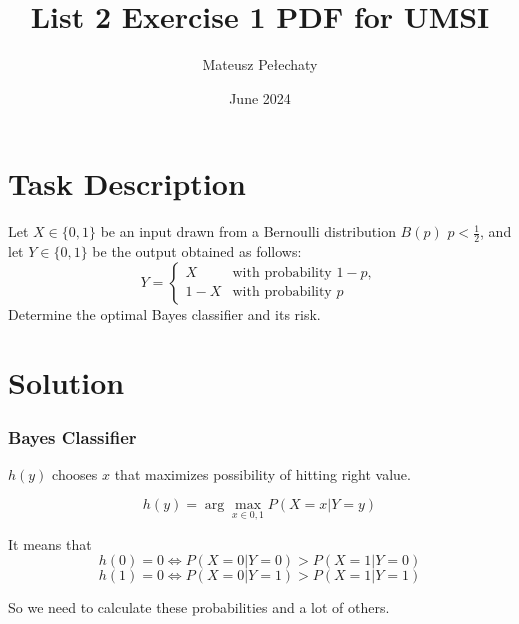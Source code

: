 \documentclass[11pt]{article}
\title{List 2 Exercise 1 PDF for UMSI}
\author{Mateusz Pełechaty}
\date{June 2024}
\begin{document}
\maketitle 

\section{Task Description}
Let $X \in \{0, 1\}$ 
be an input drawn from a Bernoulli distribution $B(p)$ $p < \frac{1}{2}$, 
and let $Y \in \{0, 1\}$ be the output obtained as follows:
$$
Y =
\begin{cases} 
X & \textrm{with probability } 1 - p, \\ 
1 - X & \textrm{with probability } p 
\end{cases}
$$
Determine the optimal Bayes classifier and its risk.

\section{Solution}

\subsubsection*{Bayes Classifier}
$h(y)$ chooses $x$ that maximizes possibility of hitting right value.

$$h(y) = \arg \max_{x \in {0, 1}} P(X=x | Y=y)$$

It means that 
$$h(0) = 0 \iff P(X=0 | Y=0) > P(X=1 | Y=0)$$
$$h(1) = 0 \iff P(X=0 | Y=1) > P(X=1 | Y=1)$$

So we need to calculate these probabilities and a lot of others.
\end{document}
